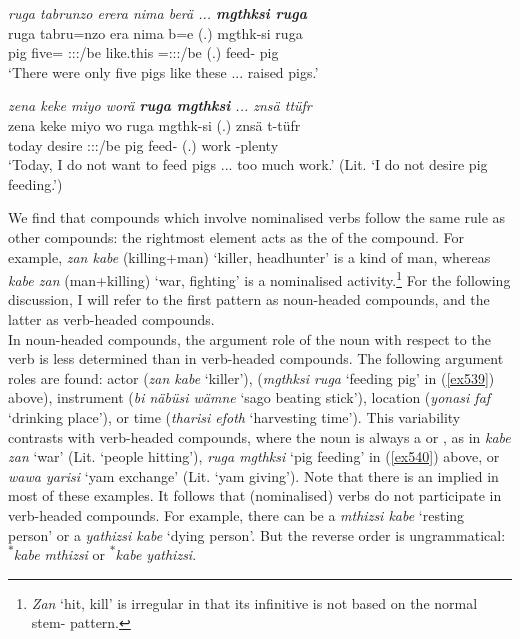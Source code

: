\begin{exe}
	\ex \emph{ruga tabrunzo erera nima berä ... \textbf{mgthksi ruga}}\\
	\gll ruga tabru=nzo era nima b=e (.) mgthk-si ruga\\
	pig five=\Only{} \Stpl:\Sbj:\Pst:\Ipfv/be {like.this} \Med=\Stpl:\Sbj:\Nonpast:\Ipfv/be (.) feed-\Nmlz{} pig\\
	\trans `There were only five pigs like these ... raised pigs.'
	\label{ex539}
\end{exe}
\begin{exe}
	\ex \emph{zena keke miyo worä \textbf{ruga mgthksi} ... znsä ttüfr}\\
	\gll zena keke miyo wo ruga mgthk-si (.) znsä t-tüfr\\
	today \Neg{} desire \Fsg:\Sbj:\Nonpast:\Ipfv/be pig feed-\Nmlz{} (.) work \Redup-plenty\\
	\trans `Today, I do not want to feed pigs ... too much work.' (Lit. `I do not desire pig feeding.')
	\label{ex540}
\end{exe}

We find that compounds which involve nominalised verbs follow the same rule as other compounds: the rightmost element acts as the  of the compound. For example, \emph{zan kabe} (killing+man) `killer, headhunter' is a kind of man, whereas \emph{kabe zan} (man+killing) `war, fighting' is a nominalised activity.\footnote{\emph{Zan} `hit, kill' is irregular in that its infinitive is not based on the normal stem-\Nmlz{} pattern.} For the following discussion, I will refer to the first pattern as noun-headed compounds, and the latter as verb-headed compounds.\\

In noun-headed compounds, the argument role of the noun with respect to the verb is less determined than in verb-headed compounds. The following argument roles are found: actor (\emph{zan kabe} `killer'),  (\emph{mgthksi ruga} `feeding pig' in (\ref{ex539}) above), instrument (\emph{bi näbüsi wämne} `sago beating stick'), location (\emph{yonasi faf} `drinking place'), or time (\emph{tharisi efoth} `harvesting time'). This variability contrasts with verb-headed compounds, where the noun is always a  or , as in \emph{kabe zan} `war' (Lit. `people hitting'), \emph{ruga mgthksi} `pig feeding' in (\ref{ex540}) above, or \emph{wawa yarisi} `yam exchange' (Lit. `yam giving'). Note that there is an implied  in most of these examples. It follows that (nominalised)  verbs do not participate in verb-headed compounds. For example, there can be a \emph{mthizsi kabe} `resting person' or a \emph{yathizsi kabe} `dying person'. But the reverse order is ungrammatical: \textsuperscript{$\ast$}\emph{kabe mthizsi} or \textsuperscript{$\ast$}\emph{kabe yathizsi}.\\

